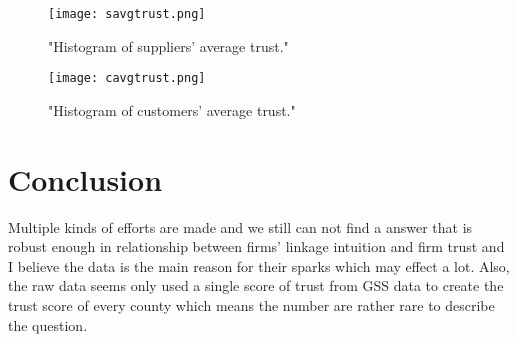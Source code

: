 \documentclass[a4paper]{article}
\begin{document}
\begin{figure}[H] 
\centering
\texttt{[image: savgtrust.png]}
\caption{\label{fig:min_gyear_2008} "Histogram of suppliers' average trust."}
\end{figure}
\begin{figure}[H] 
\centering
\texttt{[image: cavgtrust.png]}
\caption{\label{fig:min_gyear_2010} "Histogram of customers' average trust."}
\end{figure}


\section{Conclusion}
Multiple kinds of efforts are made and we still can not find a answer that is robust enough in relationship between firms' linkage intuition and firm trust and I believe the data is the main reason for their sparks which may effect a lot. Also, the raw data seems only used a single score of trust from GSS data to create the trust score of every county which means the number are rather rare to describe the question.
\end{document}
